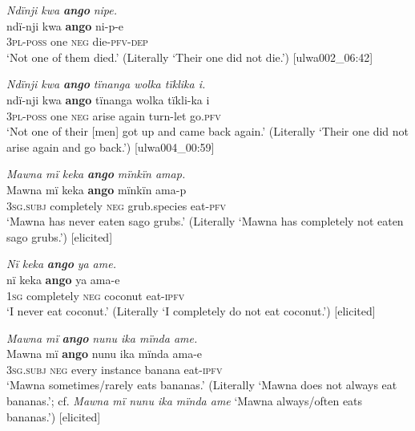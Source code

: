 \ea%
    \label{ex:syntax:131}
          \textit{Ndïnji kwa} \textbf{\textit{ango}} \textit{nipe.}\\
\gll    ndï-nji    kwa  \textbf{ango}  ni-p-e\\
    3\textsc{pl-poss}  one    \textsc{neg}  die-\textsc{pfv-dep}\\
\glt `Not one of them died.’ (Literally ‘Their one did not die.’) [ulwa002\_06:42]
\z

\ea%
    \label{ex:syntax:132}
          \textit{Ndïnji kwa} \textbf{\textit{ango}} \textit{tïnanga wolka tïklika i.}\\
\gll    ndï-nji    kwa  \textbf{ango}  tïnanga  wolka  tïkli-ka  i\\
    3\textsc{pl-poss}  one    \textsc{neg}  arise  again  turn-let  go.\textsc{pfv}\\
\glt `Not one of their [men] got up and came back again.’ (Literally ‘Their one did not arise again and go back.’) [ulwa004\_00:59]
\z

\ea%
    \label{ex:syntax:133}
          \textit{Mawna mï keka} \textbf{\textit{ango}} \textit{mïnkïn amap.}\\
\gll    Mawna  mï      keka      \textbf{ango}  mïnkïn    ama-p\\
    [name]    \textsc{3sg.subj}  completely  \textsc{neg}  grub.species  eat-\textsc{pfv}\\
\glt `Mawna has never eaten sago grubs.’ (Literally ‘Mawna has completely not eaten sago grubs.’) [elicited]
\z

\ea%
    \label{ex:syntax:134}
          \textit{Nï keka} \textbf{\textit{ango}} \textit{ya ame.}\\
\gll    nï    keka      \textbf{ango}  ya      ama-e\\
    \textsc{1sg}  completely  \textsc{neg}  coconut  eat-\textsc{ipfv}\\
\glt `I never eat coconut.’ (Literally ‘I completely do not eat coconut.’) [elicited]
\z

\ea%
    \label{ex:syntax:135}
          \textit{Mawna mï} \textbf{\textit{ango}} \textit{nunu ika mïnda ame.}\\
\gll    Mawna  mï      \textbf{ango}  nunu  ika      mïnda  ama-e\\
    [name]    \textsc{3sg.subj}  \textsc{neg}  every  instance  banana  eat-\textsc{ipfv}\\
\glt `Mawna sometimes/rarely eats bananas.’ (Literally ‘Mawna does not always eat bananas.’; cf. \textit{Mawna mï nunu ika mïnda ame} ‘Mawna always/often eats bananas.’) [elicited]
\z

